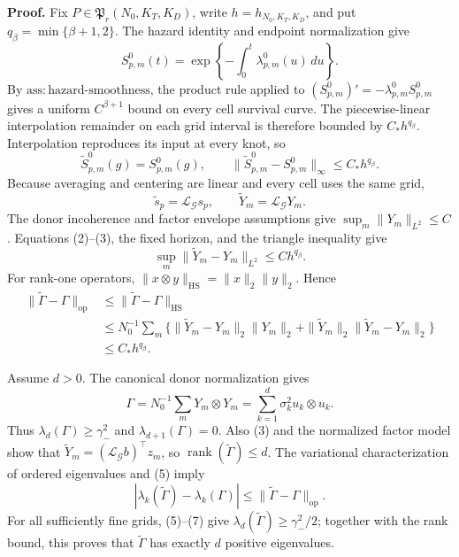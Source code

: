 \textbf{Proof.}
Fix \(P\in\mathfrak P_r(N_0,K_T,K_D)\), write
\(h=h_{N_0,K_T,K_D}\), and put
\(q_\beta=\min\{\beta+1,2\}\).  The hazard identity and endpoint
normalization give
\[
 S^0_{p,m}(t)
 =\exp\left\{-\int_0^t\lambda^0_{p,m}(u)\,du\right\}.        \tag{1}
\]
By \(\mathrm{ass:hazard\mbox{-}smoothness}\), the product rule applied to
\((S^0_{p,m})'=-\lambda^0_{p,m}S^0_{p,m}\) gives a uniform
\(C^{\beta+1}\) bound on every cell survival curve.  The piecewise-linear
interpolation remainder on each grid interval is therefore bounded by
\(C_*h^{q_\beta}\).  Interpolation reproduces its input at every knot, so
\[
 \widetilde S^0_{p,m}(g)=S^0_{p,m}(g),
 \qquad
 \|\widetilde S^0_{p,m}-S^0_{p,m}\|_\infty
 \le C_*h^{q_\beta}.                                        \tag{2}
\]
Because averaging and centering are linear and every cell uses the same
grid,
\[
 \widetilde s_p=\mathcal L_{\mathcal G}s_p,
 \qquad
 \widetilde Y_m=\mathcal L_{\mathcal G}Y_m.                 \tag{3}
\]
The donor incoherence and factor envelope assumptions give
\(\sup_m\|Y_m\|_{L^2}\le C\).  Equations (2)--(3), the fixed horizon, and
the triangle inequality give
\[
 \sup_m\|\widetilde Y_m-Y_m\|_{L^2}\le Ch^{q_\beta}.         \tag{4}
\]
For rank-one operators,
\(\|x\otimes y\|_{\mathrm{HS}}=\|x\|_2\|y\|_2\).  Hence
\[
 \begin{split}
 \|\widetilde\Gamma-\Gamma\|_{\mathrm{op}}
 &\le \|\widetilde\Gamma-\Gamma\|_{\mathrm{HS}}\\
 &\le N_0^{-1}\sum_m
 \{\|\widetilde Y_m-Y_m\|_2\|Y_m\|_2
   +\|\widetilde Y_m\|_2\|\widetilde Y_m-Y_m\|_2\}\\
 &\le C_*h^{q_\beta}.                                      \tag{5}
 \end{split}
\]

Assume \(d>0\).  The canonical donor normalization gives
\[
 \Gamma=N_0^{-1}\sum_mY_m\otimes Y_m
       =\sum_{k=1}^d\sigma_k^2u_k\otimes u_k.               \tag{6}
\]
Thus \(\lambda_d(\Gamma)\ge\gamma_-^2\) and
\(\lambda_{d+1}(\Gamma)=0\).  Also (3) and the normalized factor model show
that \(\widetilde Y_m=(\mathcal L_{\mathcal G}b)^\top z_m\), so
\(\operatorname{rank}(\widetilde\Gamma)\le d\).  The variational
characterization of ordered eigenvalues and (5) imply
\[
 |\lambda_k(\widetilde\Gamma)-\lambda_k(\Gamma)|
 \le\|\widetilde\Gamma-\Gamma\|_{\mathrm{op}}.              \tag{7}
\]
For all sufficiently fine grids, (5)--(7) give
\(\lambda_d(\widetilde\Gamma)\ge\gamma_-^2/2\); together with the rank
bound, this proves that \(\widetilde\Gamma\) has exactly \(d\) positive
eigenvalues.

